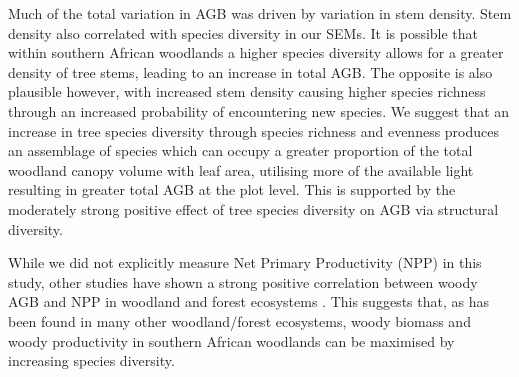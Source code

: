\documentclass[11pt,a4paper]{article}
\begin{document}

Much of the total variation in AGB was driven by variation in stem density. Stem density also correlated with species diversity in our SEMs. It is possible that within southern African woodlands a higher species diversity allows for a greater density of tree stems, leading to an increase in total AGB. The opposite is also plausible however, with increased stem density causing higher species richness through an increased probability of encountering new species. We suggest that an increase in tree species diversity through species richness and evenness produces an assemblage of species which can occupy a greater proportion of the total woodland canopy volume with leaf area, utilising more of the available light resulting in greater total AGB at the plot level. This is supported by the moderately strong positive effect of tree species diversity on AGB via structural diversity.



While we did not explicitly measure Net Primary Productivity (NPP) in this study, other studies have shown a strong positive correlation between woody AGB and NPP in woodland and forest ecosystems \citep{Chisholm2013, Prado-Junior2016}. This suggests that, as has been found in many other woodland/forest ecosystems, woody biomass and woody productivity in southern African woodlands can be maximised by increasing species diversity. 
\end{document}
